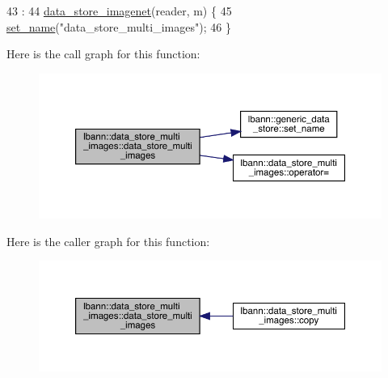 \begin{DoxyCode}
43                                                                  :
44     \hyperlink{classlbann_1_1data__store__imagenet_a3040285850664ccecb4795df3c85fb8d}{data\_store\_imagenet}(reader, m) \{
45     \hyperlink{classlbann_1_1generic__data__store_a853741295a07b5687921fc56d0d7d5b2}{set\_name}(\textcolor{stringliteral}{"data\_store\_multi\_images"});
46   \}
\end{DoxyCode}
Here is the call graph for this function\+:\nopagebreak
\begin{figure}[H]
\begin{center}
\leavevmode
\includegraphics[width=350pt]{classlbann_1_1data__store__multi__images_a1ad4fbec5c15f98422ebf7027f3a1d8a_cgraph}
\end{center}
\end{figure}
Here is the caller graph for this function\+:\nopagebreak
\begin{figure}[H]
\begin{center}
\leavevmode
\includegraphics[width=350pt]{classlbann_1_1data__store__multi__images_a1ad4fbec5c15f98422ebf7027f3a1d8a_icgraph}
\end{center}
\end{figure}
\mbox{\label{classlbann_1_1data__store__multi__images_a2ef6b228164447918fb0ba831e091777}} 
